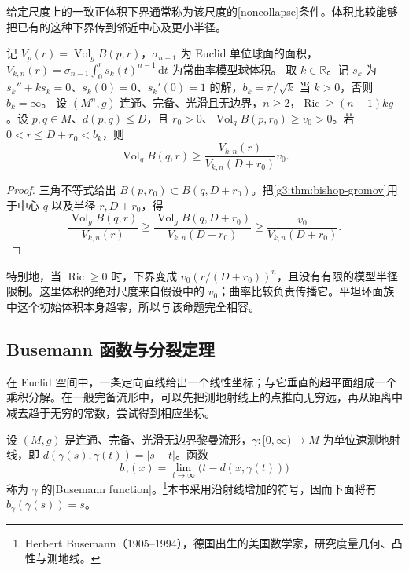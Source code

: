 给定尺度上的一致正体积下界通常称为该尺度的[noncollapse]条件。体积比较能够把已有的这种下界传到邻近中心及更小半径。

\begin{proposition}\label{g3:prop:noncollapse-propagation}
	记 \(V_p(r)=\operatorname{Vol}_g B(p,r)\)，\(\sigma_{n-1}\) 为 Euclid 单位球面的面积，\(V_{k,n}(r)=\sigma_{n-1}\int_0^r s_k(t)^{n-1}\,\mathrm dt\) 为常曲率模型球体积。
	取 \(k\in\mathbb R\)。记 \(s_k\) 为 \(s_k''+ks_k=0\)、\(s_k(0)=0\)、\(s_k'(0)=1\) 的解，\(b_k=\pi/\sqrt k\) 当 \(k>0\)，否则 \(b_k=\infty\)。
	设 \((M^n,g)\) 连通、完备、光滑且无边界，\(n\ge2\)，\(\operatorname{Ric}\ge(n-1)kg\)。设 \(p,q\in M\)、\(d(p,q)\le D\)，且 \(r_0>0\)、\(\operatorname{Vol}_g B(p,r_0)\ge v_0>0\)。若 \(0<r\le D+r_0<b_k\)，则
	\[
		\operatorname{Vol}_g B(q,r)
		\ge\frac{V_{k,n}(r)}{V_{k,n}(D+r_0)}v_0.
	\]
\end{proposition}
\begin{proof}
	三角不等式给出 \(B(p,r_0)\subset B(q,D+r_0)\)。把\cref{g3:thm:bishop-gromov}用于中心 \(q\) 以及半径 \(r,D+r_0\)，得
	\[
		\frac{\operatorname{Vol}_g B(q,r)}{V_{k,n}(r)}
		\ge\frac{\operatorname{Vol}_g B(q,D+r_0)}{V_{k,n}(D+r_0)}
		\ge\frac{v_0}{V_{k,n}(D+r_0)}.
	\]
\end{proof}

特别地，当 \(\operatorname{Ric}\ge0\) 时，下界变成 \(v_0(r/(D+r_0))^n\)，且没有有限的模型半径限制。这里体积的绝对尺度来自假设中的 \(v_0\)；曲率比较负责传播它。平坦环面族中这个初始体积本身趋零，所以与该命题完全相容。

\subsection{Busemann 函数与分裂定理}
\label{g3:subsec:0804:03}

在 Euclid 空间中，一条定向直线给出一个线性坐标；与它垂直的超平面组成一个乘积分解。在一般完备流形中，可以先把测地射线上的点推向无穷远，再从距离中减去趋于无穷的常数，尝试得到相应坐标。

\begin{definition}\label{g3:def:busemann-function}
	设 \((M,g)\) 是连通、完备、光滑无边界黎曼流形，\(\gamma:[0,\infty)\to M\) 为单位速测地射线，即 \(d(\gamma(s),\gamma(t))=|s-t|\)。函数
	\begin{equation}\label{g3:eq:busemann-sign}
		b_\gamma(x)=\lim_{t\to\infty}\bigl(t-d(x,\gamma(t))\bigr)
	\end{equation}
	称为 \(\gamma\) 的[Busemann function]。\footnote{Herbert Busemann（1905--1994），德国出生的美国数学家，研究度量几何、凸性与测地线。}本书采用沿射线增加的符号，因而下面将有 \(b_\gamma(\gamma(s))=s\)。
\end{definition}

